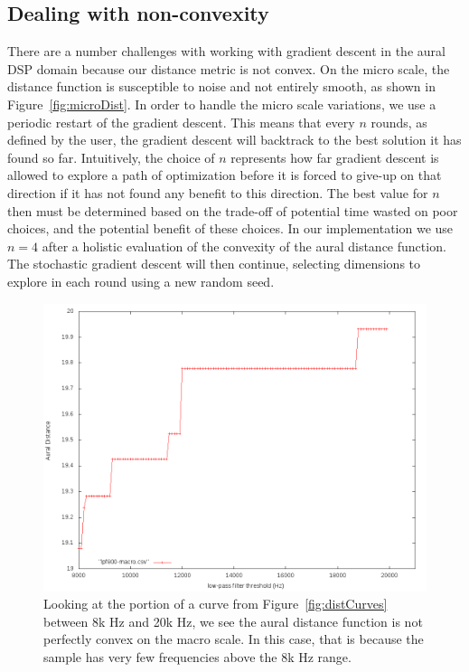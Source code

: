 \subsection{Dealing with non-convexity}
There are a number challenges with working with gradient descent in the aural DSP domain because our distance metric is not convex.
On the micro scale, the distance function is susceptible to noise and not entirely smooth, as shown in Figure~\ref{fig:microDist}.
In order to handle the micro scale variations, we use a periodic restart of the gradient descent.
This means that every $n$ rounds, as defined by the user, the gradient descent will backtrack to the best solution it has found so far.
Intuitively, the choice of $n$ represents how far gradient descent is allowed to explore a path of optimization before it is forced to give-up on that direction if it has not found any benefit to this direction.
The best value for $n$ then must be determined based on the trade-off of potential time wasted on poor choices, and the potential benefit of these choices.
In our implementation we use $n=4$ after a holistic evaluation of the convexity of the aural distance function.
The stochastic gradient descent will then continue, selecting dimensions to explore in each round using a new random seed.

\begin{figure}
\includegraphics[width=\columnwidth]{figs/distCurveMacro} 
\caption{Looking at the portion of a curve from Figure~\ref{fig:distCurves} between 8k Hz and 20k Hz, we see the aural distance function is not perfectly convex on the macro scale. In this case, that is because the sample has very few frequencies above the 8k Hz range.}
\label{fig:macroDist}
\end{figure}

